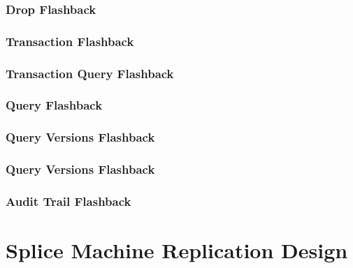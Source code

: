 \subsubsection{Drop Flashback}

\subsubsection{Transaction Flashback}

\subsubsection{Transaction Query Flashback}

\subsubsection{Query Flashback}

\subsubsection{Query Versions Flashback}

\subsubsection{Query Versions Flashback}

\subsubsection{Audit Trail Flashback}


\section{Splice Machine Replication Design}


